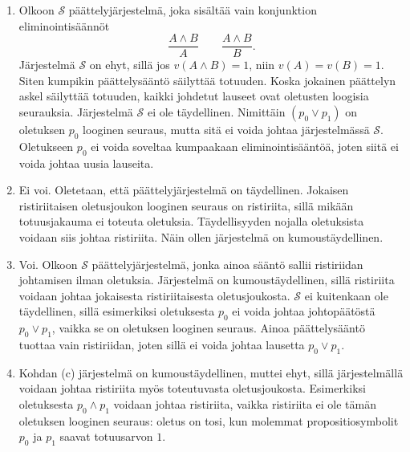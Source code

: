 \documentclass[11pt,a4paper]{amsart}
\begin{document}
\begin{solution}
\leavevmode\par
\begin{enumerate}[label=\alph*), nosep]
\item Olkoon \(\mathcal{S}\) päättelyjärjestelmä, joka sisältää vain konjunktion
eliminointisäännöt
\[
\frac{A \land B}{A}
\qquad
\frac{A \land B}{B}.
\]
Järjestelmä \(\mathcal{S}\) on ehyt, sillä jos \(v(A \land B) = 1\), niin
\(v(A) = v(B) = 1\). Siten kumpikin päättelysääntö säilyttää totuuden.
Koska jokainen päättelyn askel säilyttää totuuden, kaikki johdetut
lauseet ovat oletusten loogisia seurauksia. Järjestelmä \(\mathcal{S}\)
ei ole täydellinen. Nimittäin \((p_0 \lor p_1)\) on oletuksen \(p_0\)
looginen seuraus, mutta sitä ei voida johtaa järjestelmässä \(\mathcal{S}\).
Oletukseen \(p_0\) ei voida soveltaa kumpaakaan eliminointisääntöä,
joten siitä ei voida johtaa uusia lauseita.
\item Ei voi. Oletetaan, että päättelyjärjestelmä on täydellinen.
Jokaisen ristiriitaisen oletusjoukon looginen seuraus on ristiriita,
sillä mikään totuusjakauma ei toteuta oletuksia. Täydellisyyden nojalla
oletuksista voidaan siis johtaa ristiriita. Näin ollen järjestelmä on
kumoustäydellinen.
\item Voi. Olkoon \(\mathcal{S}\) päättelyjärjestelmä, jonka ainoa sääntö
sallii ristiriidan johtamisen ilman oletuksia. Järjestelmä on kumoustäydellinen,
sillä ristiriita voidaan johtaa jokaisesta ristiriitaisesta oletusjoukosta.
\(\mathcal{S}\) ei kuitenkaan ole täydellinen, sillä esimerkiksi oletuksesta
\(p_0\) ei voida johtaa johtopäätöstä \(p_0 \lor p_1\), vaikka se on
oletuksen looginen seuraus. Ainoa päättelysääntö tuottaa vain ristiriidan,
joten sillä ei voida johtaa lausetta \(p_0 \lor p_1\).
\item Kohdan (c) järjestelmä on kumoustäydellinen, muttei ehyt, sillä
järjestelmällä voidaan johtaa ristiriita myös toteutuvasta oletusjoukosta.
Esimerkiksi oletuksesta \(p_0 \land p_1\) voidaan johtaa ristiriita, vaikka
ristiriita ei ole tämän oletuksen looginen seuraus: oletus on tosi, kun
molemmat propositiosymbolit \(p_0\) ja \(p_1\) saavat totuusarvon \(1\).
\end{enumerate}
\end{solution}
\end{document}
